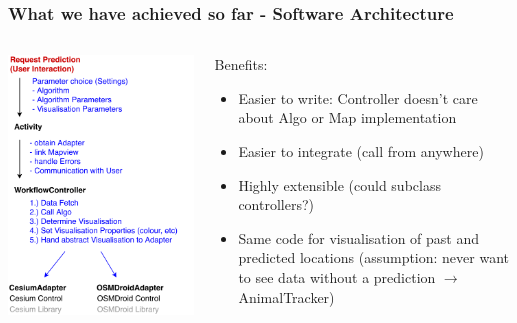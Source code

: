 \documentclass[xcolor=dvipsnames]{beamer}
\begin{document}
\begin{frame}
	\frametitle{What we have achieved so far - Software Architecture}
	\begin{columns}
	\begin{column}{0.5\textwidth}
		\includegraphics[width=\textwidth]{diagrams/controller-flow.pdf}
	\end{column}
	\begin{column}{0.5\textwidth}
		\fontsize{9pt}{9}\selectfont
		Benefits:
		\begin{itemize}
		 	 \item Easier to write: Controller doesn't care about Algo or Map implementation
		 	 \item Easier to integrate (call from anywhere)
		 	 \item Highly extensible (could subclass controllers?)
		 	 \item Same code for visualisation of past and predicted locations {\tiny(assumption: never want to see data without a prediction $\rightarrow$ AnimalTracker)}
		\end{itemize}
 	\end{column}
	\end{columns}
\end{frame}
\end{document}
